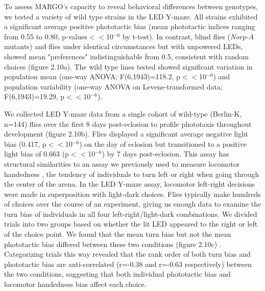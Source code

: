 \documentclass[12pt,letterpaper]{article}
\begin{document}
To assess MARGO's capacity to reveal behavioral differences between genotypes, we tested a variety of wild type strains in the LED Y-maze. All strains exhibited a significant average positive phototactic bias (mean phototactic indices ranging from 0.55 to 0.80, p-values$<<$10$^{-6}$ by t-test). In contrast, blind flies (\emph{Norp-A} mutants) and flies under identical circumstances but with unpowered LEDs, showed mean "preferences" indistinguishable from 0.5, consistent with random choices (figure 2.10a). The wild type lines tested showed significant variation in population mean (one-way ANOVA; F(6,1943)=118.2, p$<<$10$^{-6}$) and population variability (one-way ANOVA on Levene-transformed data; F(6,1943)=19.29, p$<<$10$^{-6}$).

We collected LED Y-maze data from a single cohort of wild-type (Berlin-K, n=144) flies over the first 8 days post-eclosion to profile phototaxis throughout development (figure 2.10b). Flies displayed a significant average negative light bias (0.417, p$<<$10$^{-6}$) on the day of eclosion but transitioned to a positive light bias of 0.663 (p$<<$10$^{-6}$) by 7 days post-eclosion. This assay has structural similarities to an assay we previously used to measure locomotor handedness \cite{Buchanan_Neuronal_2015}, the tendency of individuals to turn left or right when going through the center of the arena. In the LED Y-maze assay, locomotor left-right decisions were made in superposition with light-dark choices. Flies typically make hundreds of choices over the course of an experiment, giving us enough data to examine the turn bias of individuals in all four left-right/light-dark combinations. We divided trials into two groups based on whether the lit LED appeared to the right or left of the choice point. We found that the mean turn bias but not the mean phototactic bias differed between these two conditions (figure 2.10c) \cite{Ayroles_Behavioral_2015}. Categorizing trials this way revealed that the rank order of both turn bias and phototactic bias are anti-correlated (r=-0.38 and r=-0.63 respectively) between the two conditions, suggesting that both individual phototactic bias and locomotor handedness bias affect each choice.
\end{document}
